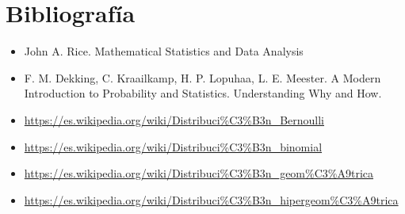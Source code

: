 \documentclass[]{book}
\providecommand{\tightlist}{%
  \setlength{\itemsep}{0pt}\setlength{\parskip}{0pt}}
\theoremstyle{plain}
\theoremstyle{definition}
\theoremstyle{definition} %
\begin{document}
\hypertarget{bibliografuxeda}{%
\section{Bibliografía}\label{bibliografuxeda}}

\begin{itemize}
\tightlist
\item
  John A. Rice. Mathematical Statistics and Data Analysis
\item
  F. M. Dekking, C. Kraailkamp, H. P. Lopuhaa, L. E. Meester. A Modern
  Introduction to Probability and Statistics. Understanding Why and How.
\item
  \url{https://es.wikipedia.org/wiki/Distribuci\%C3\%B3n_Bernoulli}
\item
  \url{https://es.wikipedia.org/wiki/Distribuci\%C3\%B3n_binomial}
\item
  \url{https://es.wikipedia.org/wiki/Distribuci\%C3\%B3n_geom\%C3\%A9trica}
\item
  \url{https://es.wikipedia.org/wiki/Distribuci\%C3\%B3n_hipergeom\%C3\%A9trica}
\end{itemize}
\end{document}
